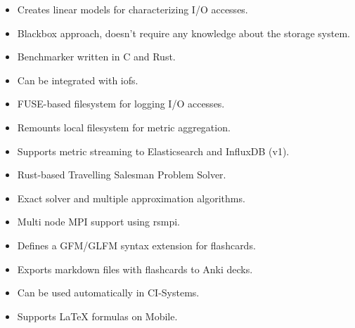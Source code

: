 \documentclass[10pt,a4paper,ragged2e,withhyper]{altacv}
\begin{document}
\begin{paracol}{2}

\medskip
\begin{itemize}
\item Creates linear models for characterizing I/O accesses.
\item Blackbox approach, doesn't require any knowledge about the storage system.
\item Benchmarker written in C and Rust.
\item Can be integrated with iofs.
\end{itemize}

\divider

\medskip
\begin{itemize}
\item FUSE-based filesystem for logging I/O accesses.
\item Remounts local filesystem for metric aggregation.
\item Supports metric streaming to Elasticsearch and InfluxDB (v1).
\end{itemize}

\divider

\medskip
\begin{itemize}
\item Rust-based Travelling Salesman Problem Solver.
\item Exact solver and multiple approximation algorithms.
\item Multi node MPI support using rsmpi.
\end{itemize}

\divider

\cvtag{\LaTeX{}}
\medskip
\begin{itemize}
\item Defines a GFM/GLFM syntax extension for flashcards.
\item Exports markdown files with flashcards to Anki decks.
\item Can be used automatically in CI-Systems.
\item Supports \LaTeX{} formulas on Mobile.
\end{itemize}


\end{paracol}
\end{document}
